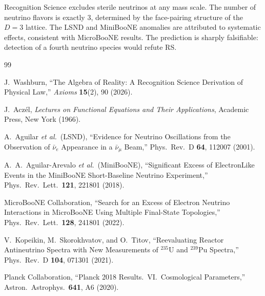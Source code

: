 \documentclass[12pt,a4paper]{article}
\theoremstyle{definition}
\theoremstyle{remark}
\begin{document}
Recognition Science excludes sterile neutrinos at any mass scale.
The number of neutrino flavors is exactly 3, determined by the
face-pairing structure of the $D = 3$ lattice.  The LSND and
MiniBooNE anomalies are attributed to systematic effects, consistent
with MicroBooNE results.  The prediction is sharply falsifiable:
detection of a fourth neutrino species would refute RS.

\begin{thebibliography}{99}

J.~Washburn, ``The Algebra of Reality: A Recognition Science Derivation
of Physical Law,'' \emph{Axioms} \textbf{15}(2), 90 (2026).

J.~Acz\'el, \textit{Lectures on Functional Equations and Their Applications},
Academic Press, New York (1966).

A.~Aguilar \textit{et al.}\ (LSND), ``Evidence for Neutrino
Oscillations from the Observation of $\bar{\nu}_e$ Appearance in a
$\bar{\nu}_\mu$ Beam,'' Phys.\ Rev.\ D \textbf{64}, 112007 (2001).

A.~A.~Aguilar-Arevalo \textit{et al.}\ (MiniBooNE), ``Significant
Excess of ElectronLike Events in the MiniBooNE Short-Baseline
Neutrino Experiment,'' Phys.\ Rev.\ Lett.\ \textbf{121}, 221801
(2018).

MicroBooNE Collaboration, ``Search for an Excess of Electron
Neutrino Interactions in MicroBooNE Using Multiple Final-State
Topologies,'' Phys.\ Rev.\ Lett.\ \textbf{128}, 241801 (2022).

V.~Kopeikin, M.~Skorokhvatov, and O.~Titov, ``Reevaluating Reactor
Antineutrino Spectra with New Measurements of $^{235}$U and
$^{239}$Pu Spectra,'' Phys.\ Rev.\ D \textbf{104}, 071301 (2021).

Planck Collaboration, ``Planck 2018 Results.\ VI.\ Cosmological
Parameters,'' Astron.\ Astrophys.\ \textbf{641}, A6 (2020).

\end{thebibliography}
\end{document}
